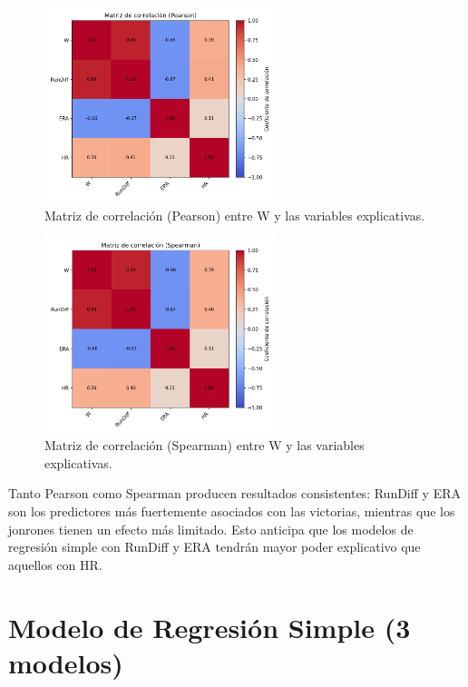 \documentclass[man,floatsintext]{apa7}
\begin{document}
\begin{figure}[H]
    \centering
    \includegraphics[width=0.6\textwidth]{../plots/final_version/heatmap_corr_pearson.png}
    \caption{Matriz de correlación (Pearson) entre W y las variables explicativas.}
    \label{fig:heatmap_pearson}
\end{figure}

\begin{figure}[H]
    \centering
    \includegraphics[width=0.6\textwidth]{../plots/final_version/heatmap_corr_spearman.png}
    \caption{Matriz de correlación (Spearman) entre W y las variables explicativas.}
    \label{fig:heatmap_spearman}
\end{figure}

Tanto Pearson como Spearman producen resultados consistentes: RunDiff y ERA son los predictores más fuertemente asociados con las victorias, mientras que los jonrones tienen un efecto más limitado. Esto anticipa que los modelos de regresión simple con RunDiff y ERA tendrán mayor poder explicativo que aquellos con HR.
\section{Modelo de Regresión Simple (3 modelos)}
\end{document}

